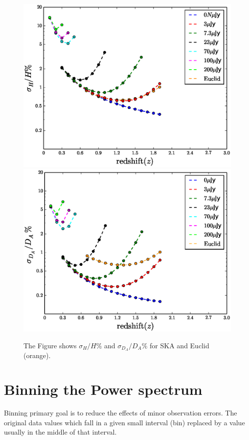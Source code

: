 \documentclass[10pt,a4paper]{article}
\begin{document}
\begin{figure}
\includegraphics[width=1.0\textwidth]{output_lnH_mario_bias.eps}
\includegraphics[width=1.0\textwidth]{output_lnda_mario_bias.eps}
\caption{The Figure shows $\sigma_H/H \%$ and $\sigma_{D_A}/D_A \%$  for SKA and  Euclid (orange).}
\label{fig:lnda_lnH}
\end{figure}


\section{Binning the Power spectrum}

Binning primary goal is to reduce the effects of minor observation errors. The original data values which fall in a given small interval (bin) replaced by a value usually in the middle of that interval. 
\end{document}
